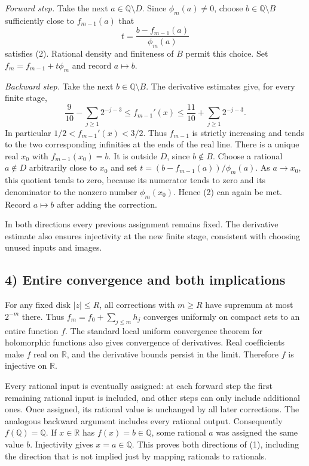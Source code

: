 \emph{Forward step.} Take the next $a\in\mathbb Q\setminus D$. Since $\phi_m(a)\ne0$, choose $b\in\mathbb Q\setminus B$ sufficiently close to $f_{m-1}(a)$ that
\[
 t=\frac{b-f_{m-1}(a)}{\phi_m(a)}
\]
satisfies (2). Rational density and finiteness of $B$ permit this choice. Set $f_m=f_{m-1}+t\phi_m$ and record $a\mapsto b$.

\emph{Backward step.} Take the next $b\in\mathbb Q\setminus B$. The derivative estimates give, for every finite stage,
\[
 \frac9{10}-\sum_{j\ge1}2^{-j-3}
 \le f_{m-1}'(x)\le
 \frac{11}{10}+\sum_{j\ge1}2^{-j-3}.
\]
In particular $1/2<f_{m-1}'(x)<3/2$. Thus $f_{m-1}$ is strictly increasing and tends to the two corresponding infinities at the ends of the real line. There is a unique real $x_0$ with $f_{m-1}(x_0)=b$. It is outside $D$, since $b\notin B$. Choose a rational $a\notin D$ arbitrarily close to $x_0$ and set $t=(b-f_{m-1}(a))/\phi_m(a)$. As $a\to x_0$, this quotient tends to zero, because its numerator tends to zero and its denominator to the nonzero number $\phi_m(x_0)$. Hence (2) can again be met. Record $a\mapsto b$ after adding the correction.

In both directions every previous assignment remains fixed. The derivative estimate also ensures injectivity at the new finite stage, consistent with choosing unused inputs and images.

\subsection*{4) Entire convergence and both implications}
For any fixed disk $|z|\le R$, all corrections with $m\ge R$ have supremum at most $2^{-m}$ there. Thus $f_m=f_0+\sum_{j\le m}h_j$ converges uniformly on compact sets to an entire function $f$. The standard local uniform convergence theorem for holomorphic functions also gives convergence of derivatives. Real coefficients make $f$ real on $\mathbb R$, and the derivative bounds persist in the limit. Therefore $f$ is injective on $\mathbb R$.

Every rational input is eventually assigned: at each forward step the first remaining rational input is included, and other steps can only include additional ones. Once assigned, its rational value is unchanged by all later corrections. The analogous backward argument includes every rational output. Consequently $f(\mathbb Q)=\mathbb Q$. If $x\in\mathbb R$ has $f(x)=b\in\mathbb Q$, some rational $a$ was assigned the same value $b$. Injectivity gives $x=a\in\mathbb Q$. This proves both directions of (1), including the direction that is not implied just by mapping rationals to rationals.

